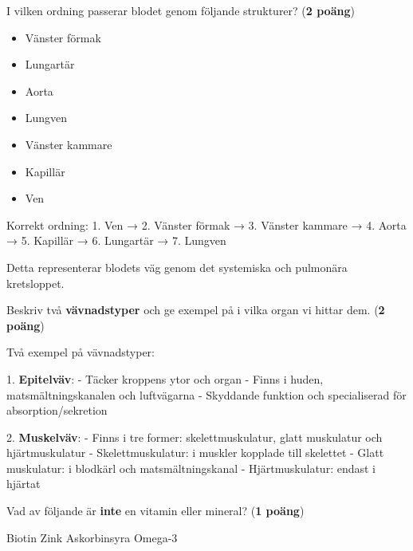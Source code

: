 \documentclass{exam}
\begin{document}
\vspace{5mm} %
\begin{center}
\end{center}
\begin{questions}

\question I vilken ordning passerar blodet genom följande strukturer? (\textbf{2 poäng})

\begin{itemize}
  \item Vänster förmak
  \item Lungartär
  \item Aorta
  \item Lungven
  \item Vänster kammare
  \item Kapillär
  \item Ven
\end{itemize}

\begin{solution}
Korrekt ordning:
1. Ven → 
2. Vänster förmak → 
3. Vänster kammare → 
4. Aorta → 
5. Kapillär → 
6. Lungartär → 
7. Lungven

Detta representerar blodets väg genom det systemiska och pulmonära kretsloppet.
\end{solution}

\vspace{5mm}

\question Beskriv två \textbf{vävnadstyper} och ge exempel på i vilka organ vi hittar dem. (\textbf{2 poäng})
\begin{solution}
Två exempel på vävnadstyper:

1. \textbf{Epitelväv}:
   - Täcker kroppens ytor och organ
   - Finns i huden, matsmältningskanalen och luftvägarna
   - Skyddande funktion och specialiserad för absorption/sekretion

2. \textbf{Muskelväv}:
   - Finns i tre former: skelettmuskulatur, glatt muskulatur och hjärtmuskulatur
   - Skelettmuskulatur: i muskler kopplade till skelettet
   - Glatt muskulatur: i blodkärl och matsmältningskanal
   - Hjärtmuskulatur: endast i hjärtat
\end{solution}

\question Vad av följande är \textbf{inte} en vitamin eller mineral? (\textbf{1 poäng})
\begin{checkboxes}
    \choice Biotin
    \choice Zink
    \choice Askorbinsyra
    \correctchoice Omega-3
\end{checkboxes}


\end{questions}
\end{document}
